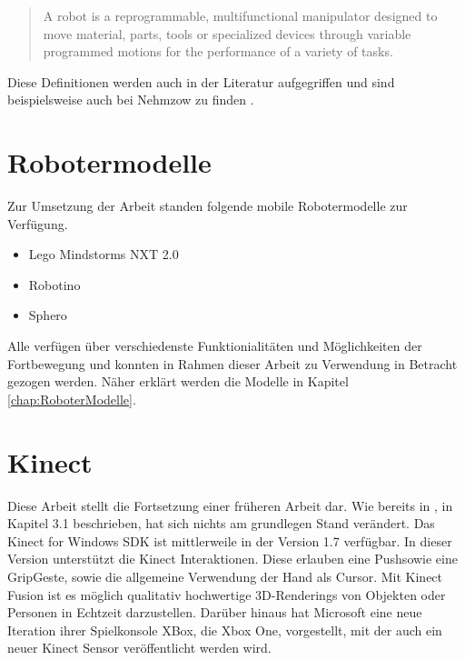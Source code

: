 
\begin{quote}
A robot is a reprogrammable, multifunctional manipulator designed to move material, parts, tools or specialized devices through variable programmed motions for the performance of a variety of tasks.
\end{quote}

Diese Definitionen werden auch in der Literatur aufgegriffen und sind beispielsweise auch bei Nehmzow zu finden \cite{bib:nehmzow}.

\section{Robotermodelle}

Zur Umsetzung der Arbeit standen folgende mobile Robotermodelle zur Verf\"ugung.

\begin{itemize}
  \item Lego Mindstorms NXT 2.0
  \item Robotino
  \item Sphero
\end{itemize}

Alle verf\"ugen \"uber verschiedenste Funktionialit\"aten und M\"oglichkeiten der Fortbewegung und konnten in Rahmen dieser Arbeit zu Verwendung in Betracht gezogen werden. N\"aher erkl\"art werden die Modelle in Kapitel \ref{chap:RoboterModelle}.

\section{Kinect}

Diese Arbeit stellt die Fortsetzung einer fr\"uheren Arbeit dar. Wie bereits in \cite{bib:Ebner_Werling}, in Kapitel 3.1 beschrieben, hat sich nichts am grundlegen Stand ver\"andert. Das Kinect for Windows SDK ist mittlerweile in der Version 1.7 verf\"ugbar\footnotemark[5] . In dieser Version unterst\"utzt die Kinect Interaktionen. Diese erlauben eine \grqq Push\grqq sowie eine \grqq Grip\grqq Geste, sowie die allgemeine Verwendung der Hand als Cursor. Mit Kinect Fusion ist es m\"oglich qualitativ hochwertige 3D-Renderings von Objekten oder Personen in Echtzeit darzustellen. Dar\"uber hinaus hat Microsoft eine neue Iteration ihrer Spielkonsole XBox, die Xbox One, vorgestellt, mit der auch ein neuer Kinect Sensor ver\"offentlicht werden wird\footnotemark[6] .


